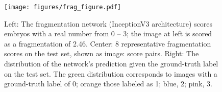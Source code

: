 \begin{figure}
\texttt{[image: figures/frag\_figure.pdf]}
\caption{
    Left: The fragmentation network (InceptionV3 architecture) scores
    embryos with a real number from 0 -- 3; the image at left is scored
    as a fragmentation of 2.46. Center: 8 representative fragmentation
    scores on the test set, shown as image: score pairs.  Right: The
    distribution of the network's prediction given the ground-truth
    label on the test set. The green distribution corresponds to images
    with a ground-truth label of 0; orange those labeled as 1; blue, 2;
    pink, 3.
}
\label{fig:frag}
\end{figure}

